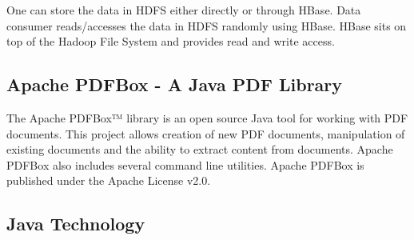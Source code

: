 \documentclass[oneside,a4paper,12pt]{report}
\begin{document}
{One can store the data in HDFS either directly or through HBase. Data consumer reads/accesses the data in HDFS randomly using HBase. HBase sits on top of the Hadoop File System and provides read and write access.
 
\subsection{Apache PDFBox - A Java PDF Library}
The Apache PDFBox™ library is an open source Java tool for working with PDF documents. This project allows creation of new PDF documents, manipulation of existing documents and the ability to extract content from documents. Apache PDFBox also includes several command line utilities. Apache PDFBox is published under the Apache License v2.0.
 
 
 \subsection{Java Technology}
 
}
\end{document}
